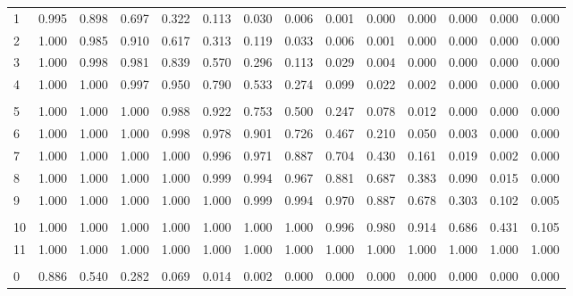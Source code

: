 \documentclass[
]{article}
\begin{document}
\begin{longtable}[t]{lrrrrrrrrrrrrr}
\hspace{1em}1 & 0.995 & 0.898 & 0.697 & 0.322 & 0.113 & 0.030 & 0.006 & 0.001 & 0.000 & 0.000 & 0.000 & 0.000 & 0.000\\
\hspace{1em}2 & 1.000 & 0.985 & 0.910 & 0.617 & 0.313 & 0.119 & 0.033 & 0.006 & 0.001 & 0.000 & 0.000 & 0.000 & 0.000\\
\hspace{1em}3 & 1.000 & 0.998 & 0.981 & 0.839 & 0.570 & 0.296 & 0.113 & 0.029 & 0.004 & 0.000 & 0.000 & 0.000 & 0.000\\
\hspace{1em}4 & 1.000 & 1.000 & 0.997 & 0.950 & 0.790 & 0.533 & 0.274 & 0.099 & 0.022 & 0.002 & 0.000 & 0.000 & 0.000\\
\addlinespace[-.7em]
\multicolumn{14}{l}{ }\\
\hspace{1em}5 & 1.000 & 1.000 & 1.000 & 0.988 & 0.922 & 0.753 & 0.500 & 0.247 & 0.078 & 0.012 & 0.000 & 0.000 & 0.000\\
\hspace{1em}6 & 1.000 & 1.000 & 1.000 & 0.998 & 0.978 & 0.901 & 0.726 & 0.467 & 0.210 & 0.050 & 0.003 & 0.000 & 0.000\\
\hspace{1em}7 & 1.000 & 1.000 & 1.000 & 1.000 & 0.996 & 0.971 & 0.887 & 0.704 & 0.430 & 0.161 & 0.019 & 0.002 & 0.000\\
\hspace{1em}8 & 1.000 & 1.000 & 1.000 & 1.000 & 0.999 & 0.994 & 0.967 & 0.881 & 0.687 & 0.383 & 0.090 & 0.015 & 0.000\\
\hspace{1em}9 & 1.000 & 1.000 & 1.000 & 1.000 & 1.000 & 0.999 & 0.994 & 0.970 & 0.887 & 0.678 & 0.303 & 0.102 & 0.005\\
\addlinespace[-.7em]
\multicolumn{14}{l}{ }\\
\hspace{1em}10 & 1.000 & 1.000 & 1.000 & 1.000 & 1.000 & 1.000 & 1.000 & 0.996 & 0.980 & 0.914 & 0.686 & 0.431 & 0.105\\
\hspace{1em}11 & 1.000 & 1.000 & 1.000 & 1.000 & 1.000 & 1.000 & 1.000 & 1.000 & 1.000 & 1.000 & 1.000 & 1.000 & 1.000\\
\addlinespace[0.3em]
\multicolumn{14}{l}{$n=12$}\\
\hspace{1em}0 & 0.886 & 0.540 & 0.282 & 0.069 & 0.014 & 0.002 & 0.000 & 0.000 & 0.000 & 0.000 & 0.000 & 0.000 & 0.000\\

\end{longtable}
\end{document}
